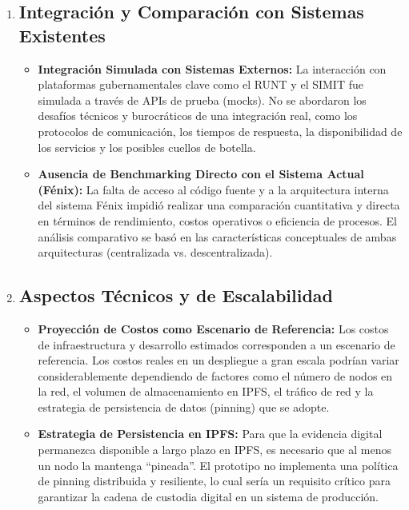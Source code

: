 \begin{enumerate}
    \item \subsection{Integración y Comparación con Sistemas Existentes}
    \begin{itemize}
        \item \textbf{Integración Simulada con Sistemas Externos:} La interacción con plataformas gubernamentales clave como el RUNT y el SIMIT fue simulada a través de APIs de prueba (mocks). No se abordaron los desafíos técnicos y burocráticos de una integración real, como los protocolos de comunicación, los tiempos de respuesta, la disponibilidad de los servicios y los posibles cuellos de botella.
        \item \textbf{Ausencia de Benchmarking Directo con el Sistema Actual (Fénix):} La falta de acceso al código fuente y a la arquitectura interna del sistema Fénix impidió realizar una comparación cuantitativa y directa en términos de rendimiento, costos operativos o eficiencia de procesos. El análisis comparativo se basó en las características conceptuales de ambas arquitecturas (centralizada vs. descentralizada).
    \end{itemize}

    \item \subsection{Aspectos Técnicos y de Escalabilidad}
    \begin{itemize}
        \item \textbf{Proyección de Costos como Escenario de Referencia:} Los costos de infraestructura y desarrollo estimados corresponden a un escenario de referencia. Los costos reales en un despliegue a gran escala podrían variar considerablemente dependiendo de factores como el número de nodos en la red, el volumen de almacenamiento en IPFS, el tráfico de red y la estrategia de persistencia de datos (pinning) que se adopte.
        \item \textbf{Estrategia de Persistencia en IPFS:} Para que la evidencia digital permanezca disponible a largo plazo en IPFS, es necesario que al menos un nodo la mantenga ``pineada''. El prototipo no implementa una política de pinning distribuida y resiliente, lo cual sería un requisito crítico para garantizar la cadena de custodia digital en un sistema de producción.
    \end{itemize}


\end{enumerate}
